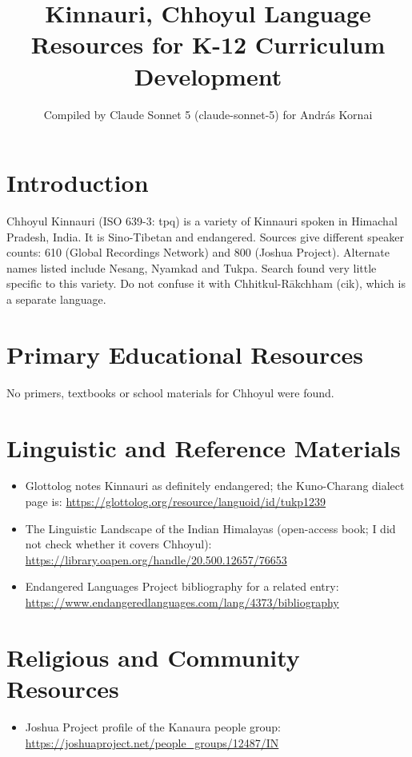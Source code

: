 \documentclass[12pt]{article}
\title{Kinnauri, Chhoyul Language Resources for K-12 Curriculum Development}
\author{Compiled by Claude Sonnet 5 (claude-sonnet-5) for Andr\'as Kornai}
\date{}
\begin{document}
\maketitle

\section{Introduction}
Chhoyul Kinnauri (ISO 639-3: tpq) is a variety of Kinnauri spoken in Himachal Pradesh, India. It is Sino-Tibetan and endangered. Sources give different speaker counts: 610 (Global Recordings Network) and 800 (Joshua Project). Alternate names listed include Nesang, Nyamkad and Tukpa. Search found very little specific to this variety. Do not confuse it with Chhitkul-R\=akchham (cik), which is a separate language.

\section{Primary Educational Resources}
No primers, textbooks or school materials for Chhoyul were found.

\section{Linguistic and Reference Materials}
\begin{itemize}
\item Glottolog notes Kinnauri as definitely endangered; the Kuno-Charang dialect page is: \url{https://glottolog.org/resource/languoid/id/tukp1239}
\item The Linguistic Landscape of the Indian Himalayas (open-access book; I did not check whether it covers Chhoyul): \url{https://library.oapen.org/handle/20.500.12657/76653}
\item Endangered Languages Project bibliography for a related entry: \url{https://www.endangeredlanguages.com/lang/4373/bibliography}
\end{itemize}

\section{Religious and Community Resources}
\begin{itemize}
\item Joshua Project profile of the Kanaura people group: \url{https://joshuaproject.net/people_groups/12487/IN}
\end{itemize}
\end{document}
